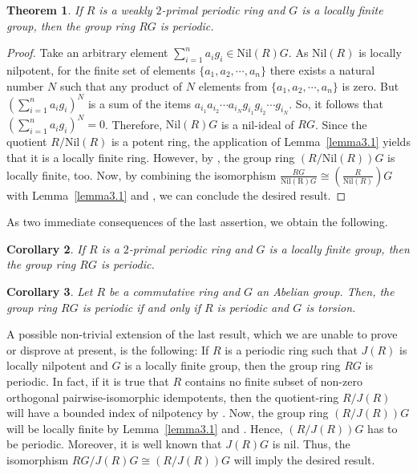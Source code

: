 \documentclass[12pt]{amsart}
\newtheorem{thm}{Theorem}[section]
\newtheorem{cor}[thm]{Corollary}
\theoremstyle{definition}
\theoremstyle{remark}
\numberwithin{equation}{section}
\begin{document}
\begin{thm}\label{theorem3.4}
If $R$ is a weakly $2$-primal periodic ring and $G$ is a locally finite group, then the group ring $RG$ is periodic.
\end{thm}

\begin{proof}
Take an arbitrary element $\sum_{i=1}^n a_ig_i \in \mathrm{Nil}(R)G$. As $\mathrm{Nil}(R)$ is locally nilpotent, for the finite set of elements $\{a_1,a_2, \cdots ,a_n\}$ there exists a natural number $N$ such that any product of $N$ elements from $\{a_1,a_2, \cdots ,a_n\}$ is zero. But ${(\sum_{i=1}^n a_ig_i)}^N$ is a sum of the items $a_{i_1}a_{i_2} \cdots a_{i_N}g_{i_1}g_{i_2} \cdots g_{i_N}$. So, it follows that ${(\sum_{i=1}^n a_ig_i)}^N=0$. Therefore, $\mathrm{Nil}(R)G$ is a nil-ideal of $RG$. Since the quotient $R/\mathrm{Nil}(R)$ is a potent ring, the application of Lemma~\ref{lemma3.1} yields that it is a locally finite ring. However, by \cite[Proposition 2.12]{HKL}, the group ring $(R/\mathrm{Nil}(R))G$ is locally finite, too. Now, by combining the isomorphism $\frac{RG}{\mathrm{Nil(R)}G} \cong (\frac{R}{\mathrm{Nil}(R)})G$ with Lemma~\ref{lemma3.1} and \cite[Corollary 3.6]{CD}, we can conclude the desired result.
\end{proof}

As two immediate consequences of the last assertion, we obtain the following.

\begin{cor}\label{corollary3.5}
If $R$ is a $2$-primal periodic ring and $G$ is a locally finite group, then the group ring $RG$ is periodic.
\end{cor}

\begin{cor}\label{corollary3.6}
Let $R$ be a commutative ring and $G$ an Abelian group. Then, the group ring $RG$ is periodic if and only if $R$ is periodic and $G$ is torsion.
\end{cor}

A possible non-trivial extension of the last result, which we are unable to prove or disprove at present, is the following: If $R$ is a periodic ring such that $J(R)$ is locally nilpotent and $G$ is a locally finite group, then the group ring $RG$ is periodic. In fact, if it is true that $R$ contains no finite subset of non-zero orthogonal pairwise-isomorphic idempotents, then the quotient-ring $R/J(R)$ will have a bounded index of nilpotency by \cite[Theorem 2.8]{W}. Now, the group ring $(R/J(R))G$ will be locally finite by Lemma~\ref{lemma3.1} and
\cite[Proposition 2.12]{HKL}. Hence, $(R/J(R))G$ has to be periodic. Moreover, it is well known that $J(R)G$ is nil.
Thus, the isomorphism $RG/J(R)G \cong (R/J(R))G$ will imply the desired result.
\end{document}
